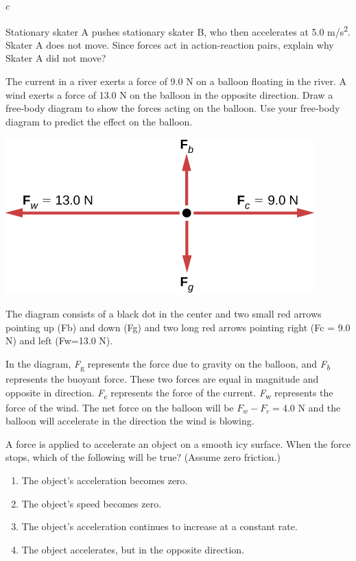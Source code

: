 \documentclass[
]{book}
\providecommand{\tightlist}{%
  \setlength{\itemsep}{0pt}\setlength{\parskip}{0pt}}
\begin{document}
\leavevmode{}%
\(c\)

\hypertarget{fs-id1683591}{}
\leavevmode{}%
Stationary skater A pushes stationary skater B, who then accelerates at
5.0 m/s\textsuperscript{2}. Skater A does not move. Since forces act in action-reaction
pairs, explain why Skater A did not move?

\hypertarget{fs-id1870798}{}
\leavevmode{}%
The current in a river exerts a force of 9.0 N on a balloon floating in
the river. A wind exerts a force of 13.0 N on the balloon in the
opposite direction. Draw a free-body diagram to show the forces acting
on the balloon. Use your free-body diagram to predict the effect on the
balloon.

\leavevmode{}%
\includegraphics{images/Figure_04_04_03.jpg}

The diagram consists of a black dot in the center and two small red
arrows pointing up (Fb) and down (Fg) and two long red arrows pointing
right (Fc = 9.0 N) and left (Fw=13.0 N).

In the diagram, \emph{F}\textsubscript{g} represents the force due to gravity on the
balloon, and \emph{F\textsubscript{b}} represents the buoyant force. These two forces are
equal in magnitude and opposite in direction. \emph{F}\textsubscript{c} represents the
force of the current. \emph{F}\textsubscript{w} represents the force of the wind. The net
force on the balloon will be \(F_{w} - F_{c} = 4.0\) N and the balloon
will accelerate in the direction the wind is blowing.

\hypertarget{fs-id946101}{}
\leavevmode{}%
A force is applied to accelerate an object on a smooth icy surface. When
the force stops, which of the following will be true? (Assume zero
friction.)

\begin{enumerate}
\def\labelenumi{\alph{enumi}.}
\tightlist
\item
  The object's acceleration becomes zero.
\item
  The object's speed becomes zero.
\item
  The object's acceleration continues to increase at a constant rate.
\item
  The object accelerates, but in the opposite direction.
\end{enumerate}
\end{document}
